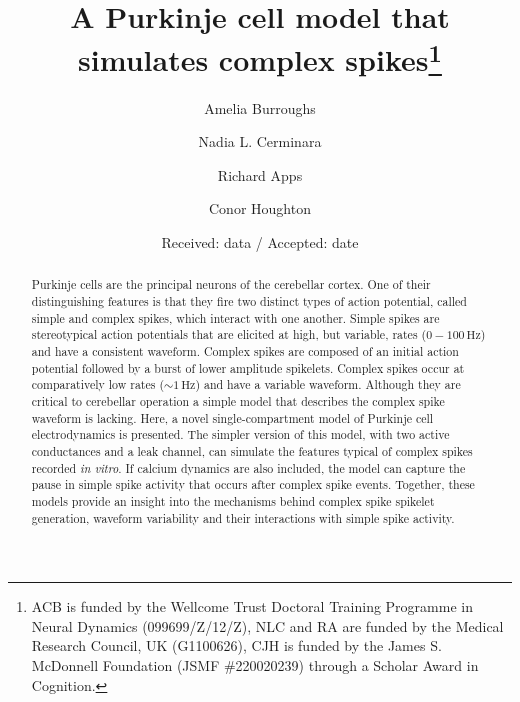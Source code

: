 \documentclass[twocolumn]{svjour3}          %
\newcommand{\hz}{\,\mathrm{Hz}}
\begin{document}
\title{A Purkinje cell model that simulates complex spikes\thanks{ACB is funded by the Wellcome Trust Doctoral Training Programme
in Neural Dynamics (099699/Z/12/Z), NLC and RA are funded by the
Medical Research Council, UK (G1100626), CJH is funded by the James
S. McDonnell Foundation (JSMF \#220020239) through a Scholar Award in
Cognition.
}}

\author{Amelia Burroughs \and Nadia L. Cerminara \and Richard Apps \and Conor Houghton}


\date{Received: data / Accepted: date}

\maketitle


\begin{abstract}

Purkinje cells are the principal neurons of the cerebellar cortex. One
of their distinguishing features is that they fire two distinct types
of action potential, called simple and complex spikes, which interact
with one another. Simple spikes are stereotypical action potentials
that are elicited at high, but variable, rates ($0-100\hz$) and have a
consistent waveform. Complex spikes are composed of an initial action
potential followed by a burst of lower amplitude spikelets. Complex
spikes occur at comparatively low rates ($\sim 1\hz$) and have a
variable waveform. Although they are critical to cerebellar operation
a simple model that describes the complex spike waveform is
lacking. Here, a novel single-compartment model of Purkinje cell
electrodynamics is presented. The simpler version of this model, with
two active conductances and a leak channel, can simulate the features typical of complex
spikes recorded \textit{in vitro}. If calcium dynamics are also
included, the model can capture the pause in simple spike activity
that occurs after complex spike events. Together, these models provide
an insight into the mechanisms behind complex spike spikelet
generation, waveform variability and their interactions with
simple spike activity.
\PACS{}

\end{abstract}
\end{document}
